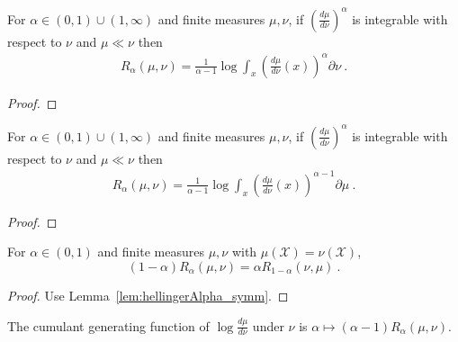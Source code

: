 \begin{lemma}
  \label{lem:renyi_eq_log_integral}
  For $\alpha \in (0,1)\cup(1, \infty)$ and finite measures $\mu, \nu$, if 
  $\left(\frac{d \mu}{d \nu}\right)^\alpha$ is integrable with respect to $\nu$ and $\mu \ll \nu$ then
  \begin{align*}
  R_\alpha(\mu, \nu) = \frac{1}{\alpha - 1} \log \int_x \left(\frac{d \mu}{d \nu}(x)\right)^\alpha \partial \nu
  \: .
  \end{align*}
\end{lemma}

\begin{proof}%
{}
\end{proof}


\begin{lemma}
  \label{lem:renyi_eq_log_integral'}
  For $\alpha \in (0,1)\cup(1, \infty)$ and finite measures $\mu, \nu$, if 
  $\left(\frac{d \mu}{d \nu}\right)^\alpha$ is integrable with respect to $\nu$ and $\mu \ll \nu$ then
  \begin{align*}
  R_\alpha(\mu, \nu) = \frac{1}{\alpha - 1} \log \int_x \left(\frac{d \mu}{d \nu}(x)\right)^{\alpha - 1} \partial \mu
  \: .
  \end{align*}
\end{lemma}

\begin{proof}%
{}
\end{proof}


\begin{lemma}
  \label{lem:renyi_symm}
  For $\alpha \in (0, 1)$ and finite measures $\mu, \nu$ with $\mu(\mathcal X) = \nu(\mathcal X)$, 
  \[(1 - \alpha) R_\alpha(\mu, \nu) = \alpha R_{1 - \alpha}(\nu, \mu) \: .\]
\end{lemma}

\begin{proof}%
{}
Use Lemma~\ref{lem:hellingerAlpha_symm}.
\end{proof}


\begin{lemma}
  \label{lem:renyi_cgf}
  The cumulant generating function of $\log\frac{d\mu}{d\nu}$ under $\nu$ is $\alpha \mapsto (\alpha - 1) R_\alpha(\mu, \nu)$.
\end{lemma}

